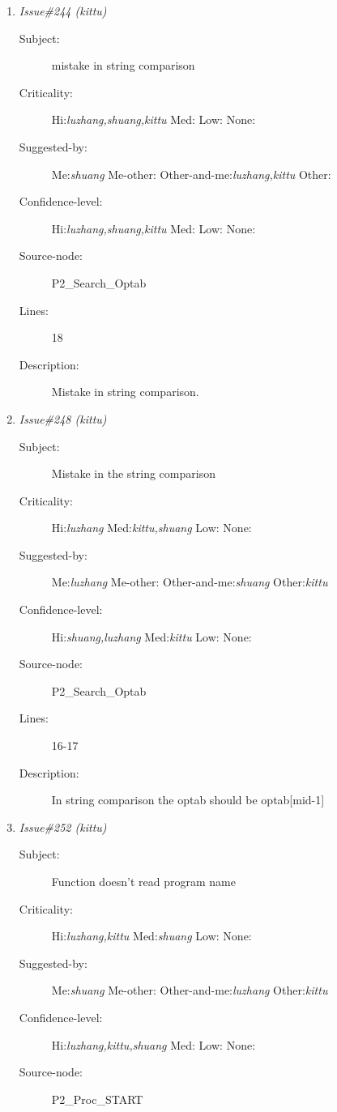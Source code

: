 \begin{enumerate}
\begin{description}
\item [Lines:] 15

\item [Description:] statement in the else condition is wrong
\end{description}
\item {\it Issue\#244 (kittu)}
\begin{description}
\item [Subject:] mistake in string comparison
\item [Criticality:] Hi:{\it luzhang,shuang,kittu} Med:{\it } Low:{\it } None:{\it }
\item [Suggested-by:] Me:{\it shuang} Me-other:{\it } Other-and-me:{\it luzhang,kittu} Other:{\it }
\item [Confidence-level:] Hi:{\it luzhang,shuang,kittu} Med:{\it } Low:{\it } None:{\it }
\item [Source-node:] P2\_Search\_Optab

\item [Lines:] 18

\item [Description:] Mistake in string comparison.
\end{description}
\item {\it Issue\#248 (kittu)}
\begin{description}
\item [Subject:] Mistake in the string comparison
\item [Criticality:] Hi:{\it luzhang} Med:{\it kittu,shuang} Low:{\it } None:{\it }
\item [Suggested-by:] Me:{\it luzhang} Me-other:{\it } Other-and-me:{\it shuang} Other:{\it kittu}
\item [Confidence-level:] Hi:{\it shuang,luzhang} Med:{\it kittu} Low:{\it } None:{\it }
\item [Source-node:] P2\_Search\_Optab

\item [Lines:] 16-17

\item [Description:] In string comparison the optab should be optab[mid-1]
\end{description}
\item {\it Issue\#252 (kittu)}
\begin{description}
\item [Subject:] Function doesn't read program name
\item [Criticality:] Hi:{\it luzhang,kittu} Med:{\it shuang} Low:{\it } None:{\it }
\item [Suggested-by:] Me:{\it shuang} Me-other:{\it } Other-and-me:{\it luzhang} Other:{\it kittu}
\item [Confidence-level:] Hi:{\it luzhang,kittu,shuang} Med:{\it } Low:{\it } None:{\it }
\item [Source-node:] P2\_Proc\_START


\end{description}
\end{enumerate}
